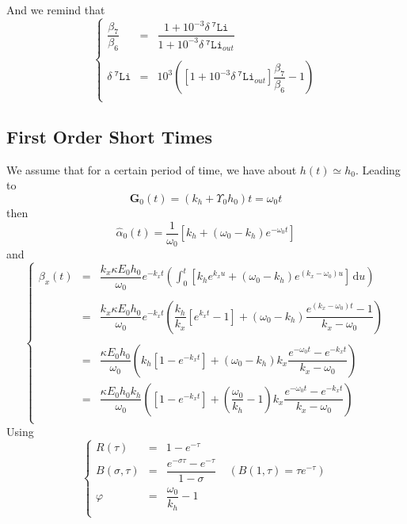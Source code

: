 \documentclass[aps,onecolumn,12pt]{revtex4}
\newcommand{\mychem}[1]{\mathtt{#1}}
\newcommand{\spLi}[1]{{~^{\mychem{#1}}\mychem{Li}}}
\newcommand{\deltaLi}{ {\delta\!\!\!\spLi{7}} }
\newcommand{\ig}{\ensuremath{\mathbf{G}}}
\begin{document}
And we remind that
\begin{equation}
\left\lbrace
\begin{array}{rcl}
	\dfrac{\beta_7}{\beta_6} & = & \dfrac{1+10^{-3}\deltaLi}{1+10^{-3}\deltaLi_{out}} \\
	\\
	\deltaLi & = & 10^3 \left( \left[1+10^{-3}\deltaLi_{out}\right] \dfrac{\beta_7}{\beta_6} - 1 \right)\\
\end{array}
\right.
\end{equation}

\subsection{First Order Short Times}
We assume that for a certain period of time, we have about $h(t)\simeq h_0$.
Leading to
\begin{equation}
	\ig_0(t) = (k_h+\Upsilon_0h_0) t = \omega_0 t
\end{equation}
then
\begin{equation}
\hat\alpha_0(t) = \dfrac{1}{\omega_0}\left[ k_h + \left(\omega_0 - k_h\right) e^{-\omega_0t}\right]
\end{equation}
and
\begin{equation}
\left\lbrace
\begin{array}{rcl}
\beta_x(t) & = & \displaystyle
\dfrac{k_x \kappa E_0 h_0}{\omega_0}  e^{-k_xt}  \left(
\int_0^t \left[ k_h e^{k_xu} + \left(\omega_0-k_h\right) e^{\left(k_x-\omega_0\right)u}\right] \, \mathrm{d} u\right) \\
\\
 & = & 
 \displaystyle
\dfrac{k_x \kappa E_0 h_0}{\omega_0}  e^{-k_xt}  \left(
\dfrac{k_h}{k_x} \left[ e^{k_xt} -1 \right] + \left(\omega_0-k_h\right) \dfrac{ e^{\left(k_x-\omega_0\right)t}-1}{k_x-\omega_0}
\right)
 \\
 \\
  & = & \dfrac{\kappa E_0 h_0}{\omega_0} 
  \left( 
  k_h \left[1-e^{-k_xt}\right] 
  + \left(\omega_0-k_h\right) k_x \dfrac{e^{-\omega_0t} - e^{-k_xt}}{k_x-\omega_0}
  \right) \\
  & = & 
 \dfrac{\kappa E_0 h_0 k_h}{\omega_0} 
  \left( 
   \left[1-e^{-k_xt}\right] 
  + \left(\dfrac{\omega_0}{k_h}-1\right) k_x \dfrac{e^{-\omega_0t} - e^{-k_xt}}{k_x-\omega_0}
  \right) \\\end{array}
\right.
\end{equation}
Using
\begin{equation}
\left\lbrace
\begin{array}{rcl}
	R(\tau) & = &1-e^{-\tau} \\
	 B(\sigma,\tau) & = & \dfrac{e^{-\sigma\tau}-e^{-\tau}}{1-\sigma} \;\;\;\; (B(1,\tau)=\tau e^{-\tau})\\
	 \varphi        & = & \dfrac{\omega_0}{k_h} - 1 \\
\end{array}
\right.
\end{equation}
\end{document}
